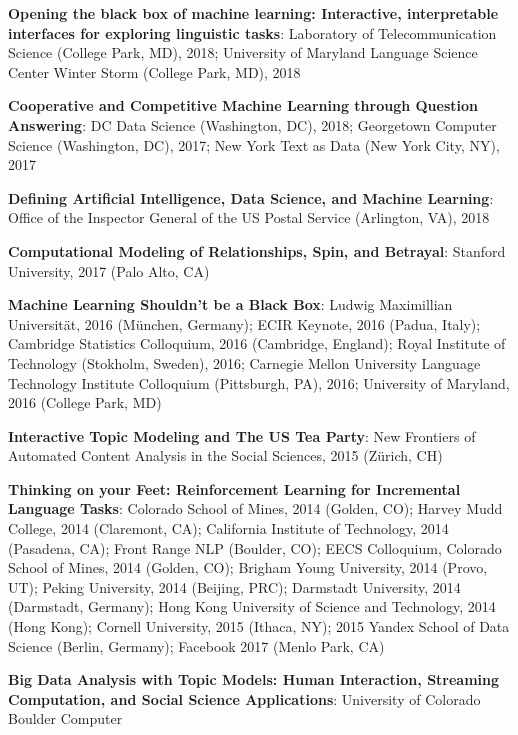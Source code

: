 {{\begin{enumerate*}
\item {\bf Opening the black box of machine learning: Interactive, interpretable interfaces for exploring linguistic tasks}: Laboratory of Telecommunication Science (College Park,
  MD), 2018;  University of Maryland Language Science Center Winter
  Storm (College Park, MD), 2018%
\item {\bf Cooperative and Competitive Machine Learning through
    Question Answering}: DC Data Science (Washington, DC), 2018; Georgetown Computer Science (Washington, DC),
  2017; New York Text as Data (New York City, NY), 2017
\item {\bf Defining Artificial Intelligence, Data Science, and Machine
    Learning}: Office of the Inspector General of the US Postal
  Service (Arlington, VA), 2018
\item {\bf Computational Modeling of Relationships, Spin, and Betrayal}: Stanford University, 2017 (Palo Alto, CA)
\item {\bf Machine Learning Shouldn't be a Black Box}: Ludwig
  Maximillian Universit\"at, 2016 (M\"unchen, Germany); ECIR Keynote,
  2016 (Padua, Italy); Cambridge Statistics Colloquium, 2016
  (Cambridge, England); Royal Institute of Technology (Stokholm,
  Sweden), 2016; Carnegie Mellon University Language Technology
    Institute Colloquium (Pittsburgh, PA), 2016; University of
    Maryland, 2016 (College Park, MD)
	\item {\bf Interactive Topic Modeling and The US Tea Party}: New Frontiers of Automated Content Analysis in the Social Sciences, 2015 (Z\"urich, CH)
	\item {\bf Thinking on your Feet: Reinforcement Learning for Incremental
Language Tasks}: Colorado School of Mines, 2014 (Golden, CO); Harvey
Mudd College, 2014 (Claremont, CA); California Institute of
Technology, 2014 (Pasadena, CA); Front Range NLP (Boulder, CO); EECS
Colloquium, Colorado School of Mines, 2014 (Golden, CO); Brigham Young
University, 2014 (Provo, UT); Peking University, 2014 (Beijing, PRC);
Darmstadt University, 2014 (Darmstadt, Germany); Hong Kong University
of Science and Technology, 2014 (Hong Kong); Cornell University, 2015
(Ithaca, NY); 2015 Yandex School of Data Science (Berlin, Germany); Facebook 2017 (Menlo Park, CA)
	\item {\bf Big Data Analysis with Topic Models: Human
            Interaction, Streaming Computation, and Social Science
            Applications}: University of Colorado Boulder Computer

\end{enumerate*}}}
